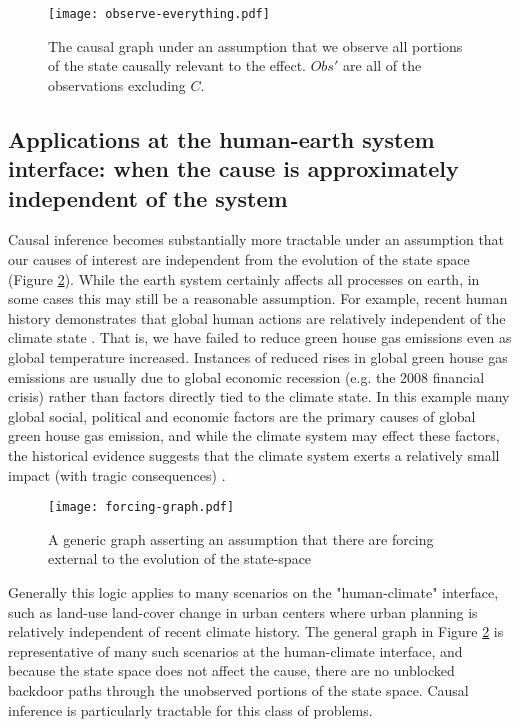 \documentclass[12pt]{article}
\begin{document}
\begin{figure}
  \texttt{[image: observe-everything.pdf]}
  \caption{The causal graph under an assumption that we observe all
    portions of the state causally relevant to the effect. $Obs'$ are
    all of the observations excluding $C$.}
  \label{fig:observed}
\end{figure}

\subsection{Applications at the human-earth system interface: when the
  cause is approximately independent of the system}
\label{human}

Causal inference becomes substantially more tractable under an
assumption that our causes of interest are independent from the
evolution of the state space (Figure \ref{fig:forcing}). While the
earth system certainly affects all processes on earth, in some cases
this may still be a reasonable assumption. For example, recent human
history demonstrates that global human actions are relatively
independent of the climate state \citep{arto2014drivers}. That is, we
have failed to reduce green house gas emissions even as global
temperature increased. Instances of reduced rises in global green
house gas emissions are usually due to global economic recession
(e.g. the 2008 financial crisis) rather than factors directly tied to
the climate state. In this example many global social, political and
economic factors are the primary causes of global green house gas
emission, and while the climate system may effect these factors, the
historical evidence suggests that the climate system exerts a
relatively small impact (with tragic consequences)
\citep{arto2014drivers}.

\begin{figure}
  \texttt{[image: forcing-graph.pdf]}
  \caption{A generic graph asserting an assumption that there are
    forcing external to the evolution of the state-space}
  \label{fig:forcing}
\end{figure}

Generally this logic applies to many scenarios on the "human-climate"
interface, such as land-use land-cover change in urban centers where
urban planning is relatively independent of recent climate
history. The general graph in Figure \ref{fig:forcing} is
representative of many such scenarios at the human-climate interface,
and because the state space does not affect the cause, there are no
unblocked backdoor paths through the unobserved portions of the state
space. Causal inference is particularly tractable for this class of
problems.
\end{document}
